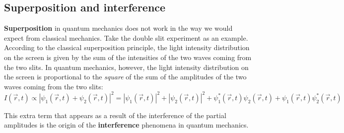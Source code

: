 \subsection{Superposition and interference}

\textbf{Superposition} in quantum mechanics does not work in the way we would expect from classical mechanics. Take the double slit experiment as an example. According to the classical superposition principle, the light intensity distribution on the screen is given by the sum of the intensities of the two waves coming from the two slits. In quantum mechanics, however, the light intensity distribution on the screen is proportional to the \textit{square} of the sum of the amplitudes of the two waves coming from the two slits:
\begin{equation}
    I(\vec{r}, t) \propto \left|\psi_1(\vec{r}, t) + \psi_2(\vec{r}, t)\right|^2 = \left|\psi_1(\vec{r}, t)\right|^2 + \left|\psi_2(\vec{r}, t)\right|^2 + \boxed{\psi_1^*(\vec{r}, t)\psi_2(\vec{r}, t) + \psi_1(\vec{r}, t)\psi_2^*(\vec{r}, t)}
\end{equation}

This extra term that appears as a result of the interference of the partial amplitudes is the origin of the \textbf{interference} phenomena in quantum mechanics.
